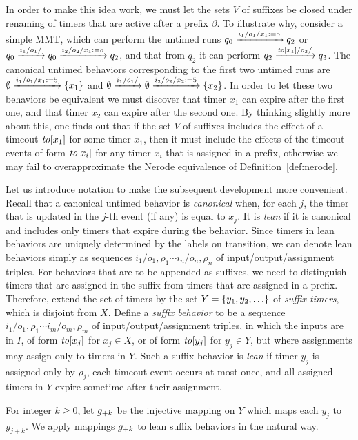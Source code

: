 In order to make this idea work, we must let the sets $V$ of suffixes be
closed under renaming of timers that are active after a prefix $\beta$.
To illustrate why, consider a simple MMT, which can perform the untimed runs
\(
q_0 \xrightarrow{i_1/o_1/x_1:= 5} q_2
\)
or
\(
q_0 \xrightarrow{i_1/o_1/} q_0 \xrightarrow{i_2/o_2/x_1:= 5} q_2
\),
and that from $q_2$ it can perform
\(
q_2 \xrightarrow{\mathit{to}[x_1]/o_3/} q_3
\).
The canonical untimed behaviors corresponding to the first two
untimed runs are
\(
\emptyset \xrightarrow{i_1/o_1/x_1:= 5} \lbrace x_1\rbrace
\)
and
\(
\emptyset \xrightarrow{i_1/o_1/} \emptyset \xrightarrow{i_2/o_2/x_2:= 5} \lbrace x_2\rbrace
\).
In order to let these two behaviors be equivalent we must discover that
timer $x_1$ can expire after the first one, and that
timer $x_2$ can expire after the second one. By thinking slightly more about
this, one finds out that if the set $V$ of suffixes includes
the effect of a timeout $\mathit{to}[x_1]$ for some timer $x_1$, then it must
include the effects of the timeout events of form $\mathit{to}[x_i]$ for any
timer $x_i$ that is assigned in a prefix, otherwise we
may fail to overapproximate the Nerode equivalence of Definition~\ref{def:nerode}.

Let us introduce notation to make the subsequent development more convenient. 
Recall that a canonical untimed behavior is \emph{canonical} when, for each $j$,
the timer that is updated in the $j$-th event (if any) is equal to $x_j$.
It is {\em lean} if it is canonical and
includes only timers that expire during the behavior. 
Since timers in lean behaviors are uniquely determined by the labels on
transition, we can denote lean behaviors simply as sequences
$i_1/o_1,\rho_1 \cdots i_n/o_n,\rho_n$ of input/output/assignment triples.
For behaviors that are to be appended as suffixes, we need to distinguish
timers that are assigned in the suffix from timers that are assigned in a prefix.
Therefore, extend the set of timers by the set $Y = \lbrace y_1,y_2,\ldots\rbrace$ of
{\em suffix timers}, which is disjoint from $X$.
Define a {\em suffix behavior} to be a sequence
$i_1/o_1,\rho_1 \cdots i_m/o_m,\rho_m$ of input/output/assignment triples,
in which the inputs are in $I$, of form $\mathit{to}[x_j]$ for $x_j \in X$, or
of form $\mathit{to}[y_j]$ for $y_j \in Y$, but where assignments may assign only
to timers in $Y$. Such a suffix behavior is {\em lean} if
timer $y_j$ is assigned only by $\rho_j$, each timeout event occurs at most once, and all assigned timers in $Y$ expire sometime after their assignment.

For integer $k \geq 0$, let $g_{+{k}}$ be the injective mapping on
$Y$ which maps each $y_j$ to $y_{j+k}$.  We apply mappings $g_{+{k}}$ to
lean suffix behaviors in the natural way.

